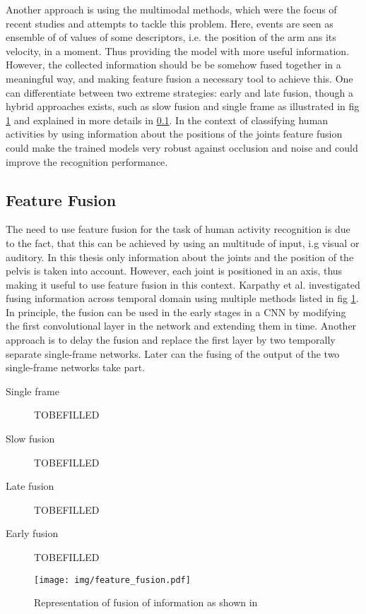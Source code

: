 Another approach is using the multimodal methods, which were the focus of recent studies and attempts to tackle this problem. Here, events are seen as ensemble of of values of some descriptors, i.e. the position of the arm ans its velocity, in a moment. Thus providing the model with more useful information. However, the collected information should be be somehow fused together in a meaningful way, and making feature fusion a necessary tool to achieve this. One can differentiate between two extreme strategies: early and late fusion, though a hybrid approaches exists, such as slow fusion and single frame as illustrated in fig \ref{fig:feature_fusion} and explained in more details in \ref{subsec:feature-fusion}. In the context of classifying human activities by using information about the positions of the joints feature fusion could make the trained models very robust against occlusion and noise and could improve the recognition performance\cite{vrigkas2015review}.
\subsection{Feature Fusion}\label{subsec:feature-fusion}
The need to use feature fusion for the task of human activity recognition is due to the fact, that this can be achieved by using an multitude of input, i.g visual or auditory. In this thesis only information about the joints and the position of the pelvis is taken into account. However, each joint is positioned in an axis, thus making it useful to use feature fusion in this context. Karpathy et al. investigated fusing information across temporal domain using multiple methods listed in fig \ref{fig:feature_fusion}. In principle, the fusion can be used in the early stages in a CNN by modifying the first convolutional layer in the network and extending them in time. Another approach is to delay the fusion and replace the first layer by two temporally separate single-frame networks. Later can the fusing of the output of the two single-frame networks take part\cite{karpathy2014large}.\newline
\begin{description}
	\item[Single frame] TOBEFILLED
	\item[Slow fusion] TOBEFILLED
	\item[Late fusion] TOBEFILLED
	\item[Early fusion] TOBEFILLED
\end{description}
\begin{figure}
	\centering
	\texttt{[image: img/feature\_fusion.pdf]}
	\caption{Representation of fusion of information as shown in \cite{karpathy2014large}}
	\label{fig:feature_fusion}
\end{figure}
